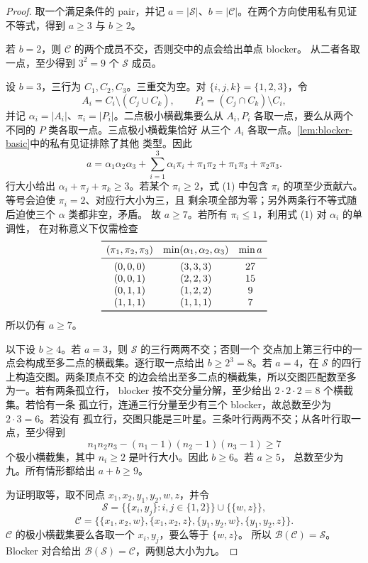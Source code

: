 \documentclass[UTF8,11pt,a4paper,fontset=fandol]{ctexart}
\theoremstyle{definition}
\theoremstyle{remark}
\newcommand{\blocker}{\mathcal{B}}
\begin{document}
\begin{proof}
取一个满足条件的 pair，并记
$a=|\mathcal S|$、$b=|\mathcal C|$。在两个方向使用私有见证不等式，得到
$a\geq3$ 与 $b\geq2$。

若 $b=2$，则 $\mathcal C$ 的两个成员不交，否则交中的点会给出单点 blocker。
从二者各取一点，至少得到 $3^2=9$ 个 $\mathcal S$ 成员。

设 $b=3$，三行为 $C_1,C_2,C_3$。三重交为空。对
$\{i,j,k\}=\{1,2,3\}$，令
\[
  A_i=C_i\setminus(C_j\cup C_k),\qquad
  P_i=(C_j\cap C_k)\setminus C_i,
\]
并记 $\alpha_i=|A_i|$、$\pi_i=|P_i|$。二点极小横截集要么从
$A_i,P_i$ 各取一点，要么从两个不同的 $P$ 类各取一点。三点极小横截集恰好
从三个 $A_i$ 各取一点。\cref{lem:blocker-basic}中的私有见证排除了其他
类型。因此
\[
  a=\alpha_1\alpha_2\alpha_3+
  \sum_{i=1}^3\alpha_i\pi_i+
  \pi_1\pi_2+\pi_1\pi_3+\pi_2\pi_3.
  \tag{1}
\]
行大小给出 $\alpha_i+\pi_j+\pi_k\geq3$。若某个 $\pi_i\geq2$，式 (1)
中包含 $\pi_i$ 的项至少贡献六。等号会迫使 $\pi_i=2$、对应行大小为三，且
剩余项全部为零；另外两条行不等式随后迫使三个 $\alpha$ 类都非空，矛盾。
故 $a\geq7$。若所有 $\pi_i\leq1$，利用式 (1) 对 $\alpha_i$ 的单调性，
在对称意义下仅需检查
\[
\begin{array}{ccc}
\toprule
(\pi_1,\pi_2,\pi_3)&
\min(\alpha_1,\alpha_2,\alpha_3)&\min a\\
\midrule
(0,0,0)&(3,3,3)&27\\
(0,0,1)&(2,2,3)&15\\
(0,1,1)&(1,2,2)&9\\
(1,1,1)&(1,1,1)&7\\
\bottomrule
\end{array}
\]
所以仍有 $a\geq7$。

以下设 $b\geq4$。若 $a=3$，则 $\mathcal S$ 的三行两两不交；否则一个
交点加上第三行中的一点会构成至多二点的横截集。逐行取一点给出
$b\geq2^3=8$。若 $a=4$，在 $\mathcal S$ 的四行上构造交图。两条顶点不交
的边会给出至多二点的横截集，所以交图匹配数至多为一。若有两条孤立行，
blocker 按不交分量分解，至少给出 $2\cdot2\cdot2=8$ 个横截集。若恰有一条
孤立行，连通三行分量至少有三个 blocker，故总数至少为 $2\cdot3=6$。若没有
孤立行，交图只能是三叶星。三条叶行两两不交；从各叶行取一点，至少得到
\[
  n_1n_2n_3-(n_1-1)(n_2-1)(n_3-1)\geq7
\]
个极小横截集，其中 $n_i\geq2$ 是叶行大小。因此 $b\geq6$。若 $a\geq5$，
总数至少为九。所有情形都给出 $a+b\geq9$。

为证明取等，取不同点 $x_1,x_2,y_1,y_2,w,z$，并令
\[
  \mathcal S=\{\{x_i,y_j\}:i,j\in\{1,2\}\}\cup\{\{w,z\}\},
\]
\[
  \mathcal C=\{\{x_1,x_2,w\},\{x_1,x_2,z\},
  \{y_1,y_2,w\},\{y_1,y_2,z\}\}.
\]
$\mathcal C$ 的极小横截集要么各取一个 $x_i,y_j$，要么等于 $\{w,z\}$。
所以 $\blocker(\mathcal C)=\mathcal S$。Blocker 对合给出
$\blocker(\mathcal S)=\mathcal C$，两侧总大小为九。
\end{proof}
\end{document}
